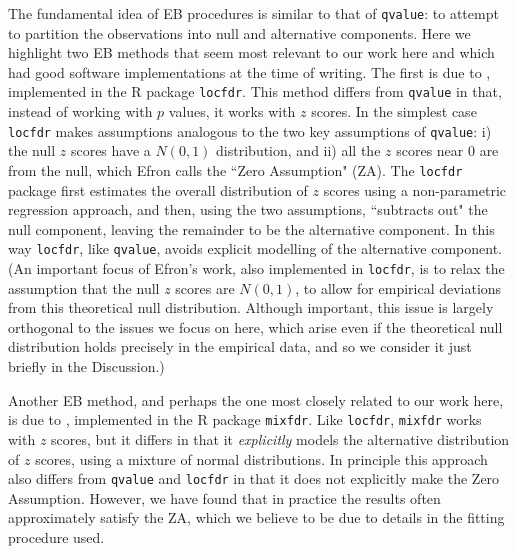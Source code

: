 \documentclass[11pt]{article}
\def\qvalue{{\tt qvalue}\xspace}
\def\locfdr{{\tt locfdr}\xspace}
\def\mixfdr{{\tt mixfdr}\xspace}
\begin{document}
The fundamental
 idea of EB procedures is similar to that of \qvalue: to attempt to partition the observations into null and alternative components.
Here we highlight two EB methods that
 seem most relevant to our work here and which had good software implementations at the time of writing. 
 The first is due to \cite{efron2008microarrays}, implemented in the R package \locfdr.
 This method differs from \qvalue in that, instead of working with $p$ values, it works with $z$ scores.
 In the simplest case
 \locfdr  makes assumptions analogous to the two key assumptions of \qvalue: i) the null $z$ scores have a $N(0,1)$ distribution,
 and ii) all the $z$ scores near 0 are from the null, which Efron
calls the ``Zero Assumption" (ZA).  
The \locfdr package first estimates the overall distribution of $z$ scores using a non-parametric regression approach, and then, using the two assumptions,  ``subtracts out" the
null component, leaving the remainder to be the alternative component. In this way \locfdr, like \qvalue, avoids explicit modelling of the alternative component.
 (An important focus of Efron's work, also implemented in \locfdr, 
 is to relax the assumption that the null $z$ scores are $N(0,1)$, to allow for empirical deviations from this
theoretical null distribution. Although important, this issue is largely orthogonal to the issues we focus on here, which arise
even if the theoretical null distribution holds precisely in the empirical data, and so we consider it just briefly in the Discussion.) 

Another EB method, and perhaps the one most closely related to our
work here, is due to \cite{muralidharan2010empirical}, implemented in the R package \mixfdr.
Like \locfdr, \mixfdr works with $z$ scores, but it differs in that it {\it explicitly} models the alternative
distribution of $z$ scores, using a mixture of normal distributions. In principle this approach also differs from \qvalue and \locfdr in
that it does not explicitly make the Zero Assumption. However, we have found that in practice the results often approximately satisfy the ZA,
which we believe to be due to details in the fitting procedure used.

\end{document}
